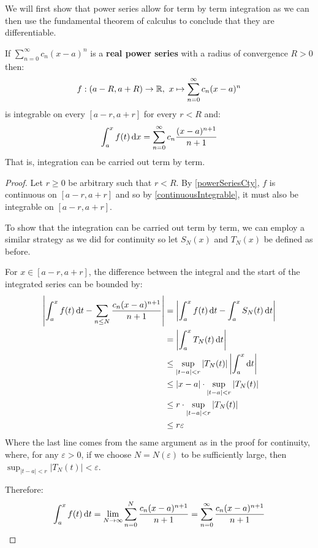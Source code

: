 \documentclass[../main.tex]{subfiles}
\begin{document}
We will first show that power series allow for term by term integration as we can then use the fundamental theorem of calculus to conclude that they are differentiable.
\begin{proposition}
  If $\sum_{n = 0}^{\infty} c_n(x - a)^{n}$ is a \textbf{real power series} with a radius of convergence $R > 0$ then: \label{powerSeriesInt}
  \[
    f: (a - R, a + R) \to \mathbb{R},\ x \mapsto \sum_{n = 0}^{\infty} c_n(x - a)^{n}
  \]
  is integrable on every $[a - r, a + r]$ for every $r < R$ and:
  \[
    \int_{a}^{x} f(t) \d{x} = \sum_{n = 0}^{\infty} c_n \frac{(x - a)^{n + 1}}{n + 1}
  \]
  That is, integration can be carried out term by term.
\end{proposition}
\begin{proof}
  \nonexaminable
  Let $r \geq 0$ be arbitrary such that $r < R$.
  By \cref{powerSeriesCty}, $f$ is continuous on $[a - r, a + r]$ and so by \cref{continuousIntegrable}, it must also be integrable on $[a - r, a + r]$.

  To show that the integration can be carried out term by term, we can employ a similar strategy as we did for continuity so let $S_N(x)$ and $T_N(x)$ be defined as before.

  For $x \in [a - r, a + r]$, the difference between the integral and the start of the integrated series can be bounded by:
  \begin{align*}
    \abs{\int_{a}^{x} f(t) \d{t} - \sum_{n \leq N} \frac{c_n(x - a)^{n + 1}}{n + 1}} &= \abs{\int_{a}^{x} f(t) \d{t} - \int_{a}^{x} S_N(t) \d{t}} \\
    &= \abs{\int_{a}^{x} T_N(t) \d{t}} \\
    &\leq \sup_{|t - a| < r} |T_N(t)| \abs{\int_{a}^{x} \d{t}} \\
    &\leq |x - a| \cdot \sup_{|t - a| < r} |T_N(t)| \\
    &\leq r \cdot \sup_{|t - a| < r} |T_N(t)| \\
    &\leq r \varepsilon
  \end{align*}
  Where the last line comes from the same argument as in the proof for continuity, where, for any $\varepsilon > 0$, if we choose $N = N(\varepsilon)$ to be sufficiently large, then $\sup_{|t - a| < r} |T_N(t)| < \varepsilon$.

  Therefore:
  \[
    \int_{a}^{x} f(t) \d{t} = \lim_{N \to \infty} \sum_{n = 0}^{N} \frac{c_n(x - a)^{n + 1}}{n + 1} = \sum_{n = 0}^{\infty} \frac{c_n(x - a)^{n + 1}}{n + 1}
  \]
\end{proof}
\end{document}
